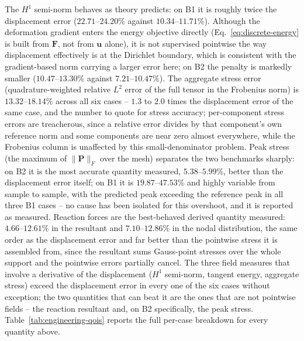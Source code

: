 \documentclass[final,5p,times]{elsarticle}
\begin{document}
The $H^1$ semi-norm behaves as theory predicts: on B1 it is roughly twice
the displacement error ($22.71$--$24.20\%$ against $10.34$--$11.71\%$).
Although the deformation gradient enters the energy objective directly
(Eq.~\eqref{eq:discrete-energy} is built from $\mathbf{F}$, not from
$\mathbf{u}$ alone), it is not supervised pointwise the way displacement
effectively is at the Dirichlet boundary, which is consistent with the
gradient-based norm carrying a larger error here; on B2 the penalty is
markedly smaller
($10.47$--$13.30\%$ against $7.21$--$10.47\%$). The aggregate stress error
(quadrature-weighted relative $L^2$ error of the full tensor in the
Frobenius norm) is $13.32$--$18.14\%$ across all six cases -- $1.3$ to
$2.0$ times the displacement error of the same case, and the number to
quote for stress accuracy; per-component stress errors are treacherous,
since a relative error divides by that component's own reference norm and
some components are near zero almost everywhere, while the Frobenius
column is unaffected by this small-denominator problem. Peak stress (the
maximum of $\|\mathbf{P}\|_F$ over the mesh) separates the two benchmarks
sharply: on B2 it is the most accurate quantity measured, $5.38$--$5.99\%$,
better than the displacement error itself; on B1 it is $19.87$--$47.53\%$
and highly variable from sample to sample, with the predicted peak
exceeding the reference peak in all three B1 cases -- no cause has been
isolated for this overshoot, and it is reported as measured. Reaction
forces are the best-behaved derived quantity measured: $4.66$--$12.61\%$
in the resultant and $7.10$--$12.86\%$ in the nodal distribution, the same
order as the displacement error and far better than the pointwise stress
it is assembled from, since the resultant sums Gauss-point stresses over
the whole support and the pointwise errors partially cancel. The three
field measures that involve a derivative of the displacement ($H^1$
semi-norm, tangent energy, aggregate stress) exceed the displacement
error in every one of the six cases without exception; the two quantities
that can beat it are the ones that are not pointwise fields -- the
reaction resultant and, on B2 specifically, the peak stress.
Table~\ref{tab:engineering-qois} reports the full per-case breakdown for
every quantity above.
\end{document}
